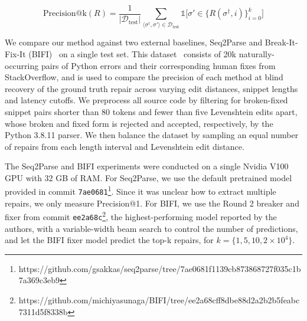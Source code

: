 \documentclass[runningheads]{llncs}
\begin{document}
\begin{equation}
  \text{Precision@k}(R) = \frac{1}{|\mathcal{D}_{\text{test}}|}\sum_{\langle\sigma^\dagger, \sigma'\rangle \in \mathcal{D}_{\text{test}}} \mathds{1}\Big[\sigma' \in \big\{R(\sigma^\dagger, i)\big\}_{i=0}^k\Big]
\end{equation}



We compare our method against two external baselines, Seq2Parse and Break-It-Fix-It (BIFI)~\cite{yasunaga2021break} on a single test set. This dataset~\cite{wong2019syntax} consists of 20k naturally-occurring pairs of Python errors and their corresponding human fixes from StackOverflow, and is used to compare the precision of each method at blind recovery of the ground truth repair across varying edit distances, snippet lengths and latency cutoffs. We preprocess all source code by filtering for broken-fixed snippet pairs shorter than 80 tokens and fewer than five Levenshtein edits apart, whose broken and fixed form is rejected and accepted, respectively, by the Python 3.8.11 parser. We then balance the dataset by sampling an equal number of repairs from each length interval and Levenshtein edit distance.


The Seq2Parse and BIFI experiments were conducted on a single Nvidia V100 GPU with 32 GB of RAM. For Seq2Parse, we use the default pretrained model provided in commit \texttt{7ae0681}\footnote{\scriptsize{https://github.com/gsakkas/seq2parse/tree/7ae0681f1139cb873868727f035c1b7a369c3eb9}}. Since it was unclear how to extract multiple repairs, we only measure Precision@1. For BIFI, we use the Round 2 breaker and fixer from commit \texttt{ee2a68c}\footnote{\scriptsize{https://github.com/michiyasunaga/BIFI/tree/ee2a68cff8dbe88d2a2b2b5feabc7311d5f8338b}}, the highest-performing model reported by the authors, with a variable-width beam search to control the number of predictions, and let the BIFI fixer model predict the top-k repairs, for $k=\{1, 5, 10, 2\times10^4\}$.
\end{document}
